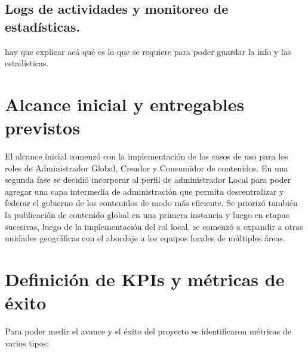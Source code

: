 \subsection{Logs de actividades y monitoreo de estadísticas.}
\label{usecases:logging}
hay que explicar acá qué es lo que se requiere para poder guardar la info y las estadísticas.


\section{Alcance inicial y entregables previstos}
El alcance inicial comenzó con la implementación de los casos de uso para los roles de Administrador Global, Creador y Consumidor de contenidos. En una segunda fase se decidió incorporar al perfil de administrador Local para poder agregar una capa intermedia de administración que permita descentralizar y federar el gobierno de los contenidos de modo más eficiente.
Se priorizó también la publicación de contenido global en una primera instancia y luego en etapas sucesivas, luego de la implementación del rol local, se comenzó a expandir a otras unidades geográficas con el abordaje a los equipos locales de múltiples áreas.

\section{Definición de KPIs y métricas de éxito}
\label{success:metrics}

Para poder medir el avance y el éxito del proyecto se identificaron métricas de varios tipos:

